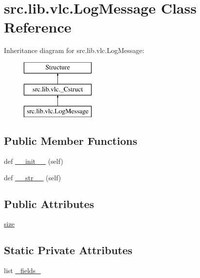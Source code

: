 \hypertarget{classsrc_1_1lib_1_1vlc_1_1LogMessage}{}\section{src.\+lib.\+vlc.\+Log\+Message Class Reference}
\label{classsrc_1_1lib_1_1vlc_1_1LogMessage}
Inheritance diagram for src.\+lib.\+vlc.\+Log\+Message\+:\begin{figure}[H]
\begin{center}
\leavevmode
\includegraphics[height=3.000000cm]{classsrc_1_1lib_1_1vlc_1_1LogMessage}
\end{center}
\end{figure}
\subsection*{Public Member Functions}
\begin{DoxyCompactItemize}
\item 
def \hyperlink{classsrc_1_1lib_1_1vlc_1_1LogMessage_a5ec0673aa9263882a8a35845a9fb1f3b}{\+\_\+\+\_\+init\+\_\+\+\_\+} (self)
\item 
def \hyperlink{classsrc_1_1lib_1_1vlc_1_1LogMessage_a55f7184ac150ef8ed1a43742f1edaca9}{\+\_\+\+\_\+str\+\_\+\+\_\+} (self)
\end{DoxyCompactItemize}
\subsection*{Public Attributes}
\begin{DoxyCompactItemize}
\item 
\hyperlink{classsrc_1_1lib_1_1vlc_1_1LogMessage_a1be1cdb16716541b9a5a19a26072fe79}{size}
\end{DoxyCompactItemize}
\subsection*{Static Private Attributes}
\begin{DoxyCompactItemize}
\item 
list \hyperlink{classsrc_1_1lib_1_1vlc_1_1LogMessage_a030acfe26d6f47b2c5cda7e4a9f3c2eb}{\+\_\+fields\+\_\+}
\end{DoxyCompactItemize}


